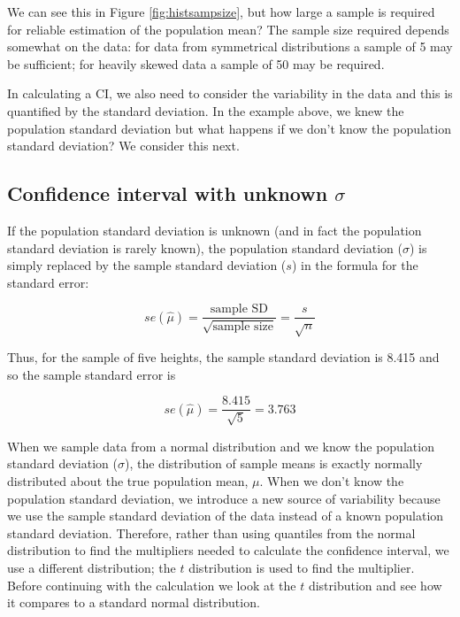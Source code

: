 \documentclass[
  oneside]{krantz}
\begin{document}
We can see this in Figure \ref{fig:histsampsize}, but how large a sample is required for reliable estimation of the population mean? The sample size required depends somewhat on the data: for data from symmetrical distributions a sample of 5 may be sufficient; for heavily skewed data a sample of 50 may be required.

In calculating a CI, we also need to consider the variability in the data and this is quantified by the standard deviation. In the example above, we knew the population standard deviation but what happens if we don't know the population standard deviation? We consider this next.

\hypertarget{confidence-interval-with-unknown-sigma}{%
\subsection{\texorpdfstring{Confidence interval with unknown \(\sigma\)}{Confidence interval with unknown \textbackslash sigma}}\label{confidence-interval-with-unknown-sigma}}

If the population standard deviation is unknown (and in fact the population standard deviation is rarely known), the population standard deviation (\(\sigma\)) is simply replaced by the sample standard deviation (\(s\)) in the formula for the standard error:

\[se(\hat \mu)=\frac{\textrm{sample SD}}{\sqrt{\textrm{sample size}}} = \frac{s}{\sqrt{n}}\]

Thus, for the sample of five heights, the sample standard deviation is 8.415 and so the sample standard error is

\[se(\hat \mu) = \frac{8.415}{\sqrt{5}} = 3.763\]

When we sample data from a normal distribution and we know the population standard deviation (\(\sigma\)), the distribution of sample means is exactly normally distributed about the true population mean, \(\mu\). When we don't know the population standard deviation, we introduce a new source of variability because we use the sample standard deviation of the data instead of a known population standard deviation. Therefore, rather than using quantiles from the normal distribution to find the multipliers needed to calculate the confidence interval, we use a different distribution; the \(t\) distribution is used to find the multiplier. Before continuing with the calculation we look at the \(t\) distribution and see how it compares to a standard normal distribution.
\end{document}
